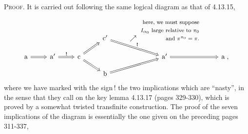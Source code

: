 \documentclass[11pt]{article}
\begin{document}
\textsc{Proof}. It is carried out following the same logical diagram as that of 4.13.15,
\[
\begin{tikzcd}[row sep=small]
& & & \mathrm{c}' \arrow[dr, Rightarrow, "\textbf{!}"] & \nearrow\ \begin{tabular}[b]{@{}r@{}}\footnotesize here, we must suppose\\ \footnotesize $I_{\alpha_0}$ large relative to $\pi_0$\\ \footnotesize and $\pi^{\pi_0} = \pi$.\end{tabular} & \\
\mathrm{a} \arrow[r, Rightarrow] & \mathrm{a}' \arrow[r, Rightarrow, "\textbf{!}"] & \mathrm{c} \arrow[ur, Rightarrow] \arrow[dr, Rightarrow] & & \mathrm{a}' \arrow[r, Rightarrow] & \mathrm{a} \; , \\
& & & \mathrm{b} \arrow[ur, Rightarrow] & &
\end{tikzcd}
\]
where we have marked with the sign\,! the two implications which are ``nasty'', in the sense that they call on the key lemma 4.13.17 (pages 329-330), which is proved by a somewhat twisted transfinite construction. The proof of the seven implications of the diagram is essentially
the one given on the preceding pages 311-337, %
\end{document}
